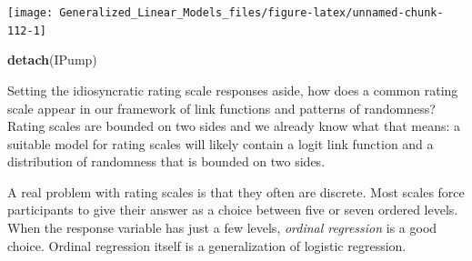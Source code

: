 \documentclass[]{svmono}
\newenvironment{Shaded}{\begin{snugshade}}{\end{snugshade}}
\newcommand{\KeywordTok}[1]{\textcolor[rgb]{0.13,0.29,0.53}{\textbf{#1}}}
\newcommand{\DataTypeTok}[1]{\textcolor[rgb]{0.13,0.29,0.53}{#1}}
\newcommand{\DecValTok}[1]{\textcolor[rgb]{0.00,0.00,0.81}{#1}}
\newcommand{\StringTok}[1]{\textcolor[rgb]{0.31,0.60,0.02}{#1}}
\newcommand{\OperatorTok}[1]{\textcolor[rgb]{0.81,0.36,0.00}{\textbf{#1}}}
\newcommand{\NormalTok}[1]{#1}
\begin{document}
\begin{Shaded}
\end{Shaded}

\texttt{[image: Generalized\_Linear\_Models\_files/figure-latex/unnamed-chunk-112-1]}

\begin{Shaded}
\begin{Highlighting}[]
\KeywordTok{detach}\NormalTok{(IPump)}
\end{Highlighting}
\end{Shaded}

Setting the idiosyncratic rating scale responses aside, how does a
common rating scale appear in our framework of link functions and
patterns of randomness? Rating scales are bounded on two sides and we
already know what that means: a suitable model for rating scales will
likely contain a logit link function and a distribution of randomness
that is bounded on two sides.

A real problem with rating scales is that they often are discrete. Most
scales force participants to give their answer as a choice between five
or seven ordered levels. When the response variable has just a few
levels, \emph{ordinal regression} is a good choice. Ordinal regression
itself is a generalization of logistic regression.
\end{document}
